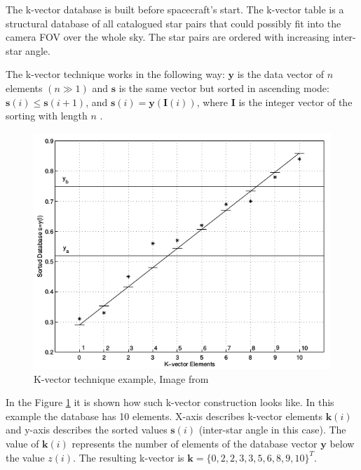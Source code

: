 \documentclass[12pt,a4paper,oneside]{article}
\begin{document}
The k-vector database is built before spacecraft's start. The k-vector table is a structural database of all catalogued star pairs that could possibly fit into the camera FOV over the whole sky. 
The star pairs are ordered with increasing inter-star angle.

The k-vector technique works in the following way: $\bm{y}$ is the data vector of $n$ elements $(n \gg 1)$ and $\bm{s}$ is the same vector but sorted in ascending mode: $\bm{s}(i) \le \bm{s}(i+1)$, and $\bm{s}(i) = \bm{y}(\bm{I}(i))$, where $\bm{I}$ is the integer vector of the sorting with length $n$ \cite{mortari2013k}.


\begin{figure}[!htbp]
\includegraphics[scale=0.57]{k-vector-example.png}
\centering
\caption{K-vector technique example, Image from \citep{mortari2000k}}
\label{fig:k-vector-example}
\end{figure}


In the Figure \ref{fig:k-vector-example} it is shown how such k-vector construction looks like. In this example the database has 10 elements. X-axis describes k-vector elements $\bm{k}(i)$ and y-axis describes the sorted values $\bm{s}(i)$ (inter-star angle in this case). The value of $\bm{k}(i)$ represents the number of elements of the database vector $\bm{y}$ below the value $z(i)$.
The resulting k-vector is $\bm{k} = \{0, 2, 2, 3, 3, 5, 6, 8, 9, 10\}^T$.
\end{document}
